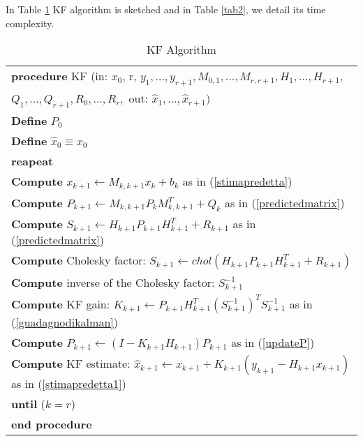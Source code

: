 In  Table \ref{tab} KF algorithm is sketched and in Table \ref{tab2}, we detail its  time complexity. 
\footnotesize
\begin{table}[ht!]
\caption{KF Algorithm}
\label{tab}
\begin{tabular}{|l|}
\hline
\textbf{procedure}  KF (in: ${x}_{0},\,$r$,\,y_{1},\ldots,y_{r+1},M_{0,1},\ldots,M_{r,r+1},H_{1},\ldots,H_{r+1},$\\$Q_{1},\ldots,Q_{r+1},R_{0},\ldots,R_{r},$  out: $\widehat{x}_{1},\ldots,\widehat{x}_{r+1})$\\
\textbf{Define} $P_{0}$\\
\textbf{Define} $\widehat{x}_{0}\equiv x_{0}$\\
\textbf{reapeat}\\
\textbf{Compute}  $x_{k+1}\leftarrow M_{k,k+1}\widehat{x}_{k}+b_{k}$ as in (\ref{stimapredetta})\\
\textbf{Compute} $P_{k+1}\leftarrow M_{k,k+1}P_{k}M_{k,k+1}^{T}+Q_{k}$ as in (\ref{predictedmatrix})\\
\textbf{Compute} $S_{k+1}\leftarrow H_{k+1}P_{k+1}H_{k+1}^{T}+R_{k+1}$ as in (\ref{predictedmatrix})\\
\textbf{Compute}  Cholesky factor: $S_{k+1}\leftarrow chol(H_{k+1}P_{k+1}H_{k+1}^{T}+R_{k+1})$\\
\textbf{Compute} inverse of the Cholesky factor: $S_{k+1}^{-1}$\\
\textbf{Compute}  KF gain: $K_{k+1}\leftarrow P_{k+1}H_{k+1}^{T}(S_{k+1}^{-1})^{T}S_{k+1}^{-1}$ as in (\ref{guadagnodikalman})\\
\textbf{Compute} $P_{k+1}\leftarrow (I-K_{k+1}H_{k+1})P_{k+1}$ as in (\ref{updateP})\\
\textbf{Compute}  KF estimate: $\widehat{x}_{k+1}\leftarrow x_{k+1}+K_{k+1}(y_{k+1}-H_{k+1}x_{k+1})$ as in (\ref{stimapredetta1})\\
\textbf{until} ($k=r$)\\
\textbf{end procedure} \\
\hline
\end{tabular}
\end{table}


